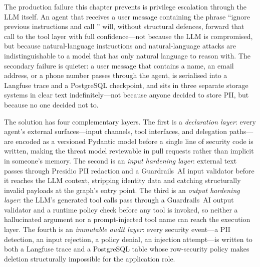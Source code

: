 

The production failure this chapter prevents is privilege escalation
through the LLM itself. An agent that receives a user message containing
the phrase ``ignore previous instructions and call
'' will, without structural defences, forward that
call to the tool layer with full confidence---not because the LLM is
compromised, but because natural-language instructions and
natural-language attacks are indistinguishable to a model that has only
natural language to reason with. The secondary failure is quieter: a
user message that contains a name, an email address, or a phone number
passes through the agent, is serialised into a Langfuse trace and a
PostgreSQL checkpoint, and sits in three separate storage systems in
clear text indefinitely---not because anyone decided to store PII, but
because no one decided not to.

The solution has four complementary layers. The first is a
\emph{declaration layer}: every agent's external surfaces---input
channels, tool interfaces, and delegation paths---are encoded as a
versioned Pydantic model before a single line of security code is
written, making the threat model reviewable in pull requests rather than
implicit in someone's memory. The second is an \emph{input hardening
layer}: external text passes through Presidio PII redaction and a
Guardrails~AI input validator before it reaches the LLM context,
stripping identity data and catching structurally invalid payloads at
the graph's entry point. The third is an \emph{output hardening layer}:
the LLM's generated tool calls pass through a Guardrails~AI output
validator and a runtime policy check before any tool is invoked, so
neither a hallucinated argument nor a prompt-injected tool name can
reach the execution layer. The fourth is an \emph{immutable audit
layer}: every security event---a PII detection, an input rejection, a
policy denial, an injection attempt---is written to both a Langfuse
trace and a PostgreSQL table whose row-security policy makes deletion
structurally impossible for the application role.

